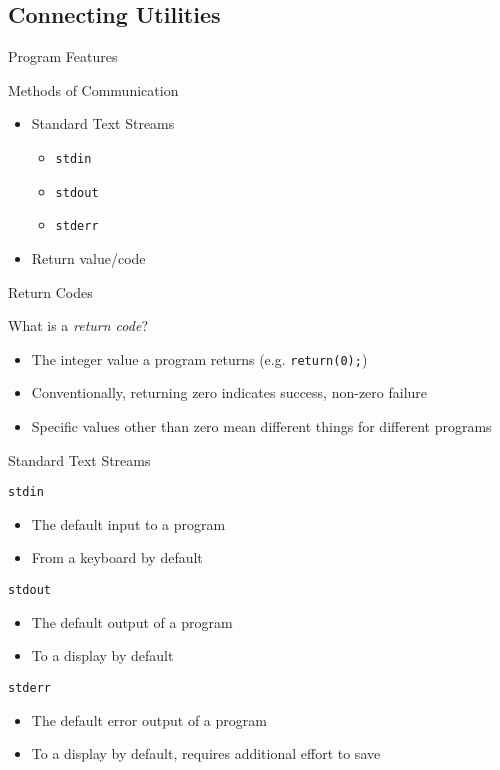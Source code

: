 \documentclass[table,dvipsnames]{beamer}
\begin{document}
\subsection{Connecting Utilities}

\begin{frame}{Program Features}
	\begin{block}{Methods of Communication}
		\begin{itemize}
			\item Standard Text Streams
				\begin{itemize}
					\item \texttt{stdin} 
					\item \texttt{stdout}
					\item \texttt{stderr}
				\end{itemize}
			\item Return value/code
		\end{itemize}
	\end{block}
\end{frame}

\begin{frame}{Return Codes}
	\begin{block}{What is a \emph{return code}?}
		\begin{itemize}
			\item The integer value a program returns (e.g. \texttt{return(0);})
			\item Conventionally, returning zero indicates success, non-zero
				failure
			\item Specific values other than zero mean different things for
				different programs
		\end{itemize}
	\end{block}
\end{frame}

\begin{frame}{Standard Text Streams}
	\begin{block}{\texttt{stdin}}
		\begin{itemize}
			\item The default input to a program
			\item From a keyboard by default
		\end{itemize}
	\end{block}
	\begin{block}{\texttt{stdout}}
		\begin{itemize}
			\item The default output of a program
			\item To a display by default
		\end{itemize}
	\end{block}
	\begin{block}{\texttt{stderr}}
		\begin{itemize}
			\item The default error output of a program
			\item To a display by default, requires additional effort to save
		\end{itemize}
	\end{block}
\end{frame}
\end{document}
